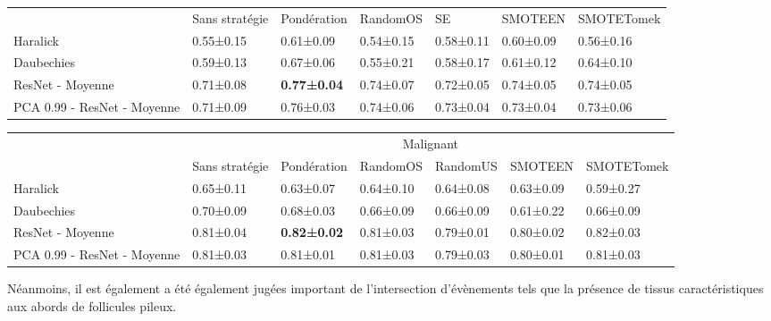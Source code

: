 \begin{table}[H]
\begin{tabular}{lllllll}
                            & Sans stratégie& Pondération        & RandomOS  & SE  & SMOTEEN   & SMOTETomek \\
Haralick                    & 0.55±0.15     & 0.61±0.09          & 0.54±0.15 & 0.58±0.11 & 0.60±0.09 & 0.56±0.16  \\
Daubechies                  & 0.59±0.13     & 0.67±0.06          & 0.55±0.21 & 0.58±0.17 & 0.61±0.12 & 0.64±0.10  \\
\rowcolor[HTML]{E7E6E6} 
ResNet - Moyenne            & 0.71±0.08     & \textbf{0.77±0.04} & 0.74±0.07 & 0.72±0.05 & 0.74±0.05 & 0.74±0.05  \\
PCA 0.99 - ResNet - Moyenne & 0.71±0.09     & 0.76±0.03          & 0.74±0.06 & 0.73±0.04 & 0.73±0.04 & 0.73±0.06 
\end{tabular}
\end{table}\par

\begin{table}[H]
\begin{tabular}{lllllll}
                            & \multicolumn{6}{c}{Malignant}                                                     \\
                            & Sans stratégie& Pondération       & RandomOS  & RandomUS  & SMOTEEN   & SMOTETomek \\
Haralick                    & 0.65±0.11     & 0.63±0.07         & 0.64±0.10 & 0.64±0.08 & 0.63±0.09 & 0.59±0.27  \\
Daubechies                  & 0.70±0.09     & 0.68±0.03         & 0.66±0.09 & 0.66±0.09 & 0.61±0.22 & 0.66±0.09  \\
\rowcolor[HTML]{E7E6E6} 
ResNet - Moyenne            & 0.81±0.04     & \textbf{0.82±0.02}& 0.81±0.03 & 0.79±0.01 & 0.80±0.02 & 0.82±0.03  \\
PCA 0.99 - ResNet - Moyenne & 0.81±0.03     & 0.81±0.01         & 0.81±0.03 & 0.79±0.03 & 0.80±0.01 & 0.81±0.03 
\end{tabular}
\end{table}\par


Néanmoins, il est également a été également jugées important de l'intersection d'évènements tels que la présence de tissus caractéristiques aux abords de follicules pileux.\par